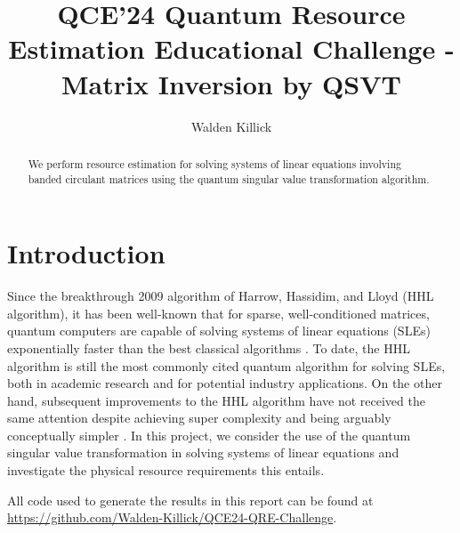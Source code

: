 \documentclass[11pt, twocolumn]{article}
\begin{document}
\title{QCE'24 Quantum Resource Estimation Educational Challenge - Matrix Inversion by QSVT}
\author{Walden Killick}

\maketitle

\begin{abstract}
	We perform resource estimation for solving systems of linear equations involving banded circulant matrices using the quantum singular value transformation algorithm.
\end{abstract}

\section{Introduction}

Since the breakthrough 2009 algorithm of Harrow, Hassidim, and Lloyd (HHL algorithm), it has been well-known that for sparse, well-conditioned matrices, quantum computers are capable of solving systems of linear equations (SLEs) exponentially faster than the best classical algorithms \cite{harrow2009quantum}. To date, the HHL algorithm is still the most commonly cited quantum algorithm for solving SLEs, both in academic research and for potential industry applications. On the other hand, subsequent improvements to the HHL algorithm have not received the same attention despite achieving super complexity and being arguably conceptually simpler \cite{martyn2021grand}. In this project, we consider the use of the quantum singular value transformation \cite{gilyen2019quantum} in solving systems of linear equations and investigate the physical resource requirements this entails.

All code used to generate the results in this report can  be found at \href{https://github.com/Walden-Killick/QCE24-QRE-Challenge}{https://github.com/Walden-Killick/QCE24-QRE-Challenge}.

\newpage

\printbibliography
\end{document}
